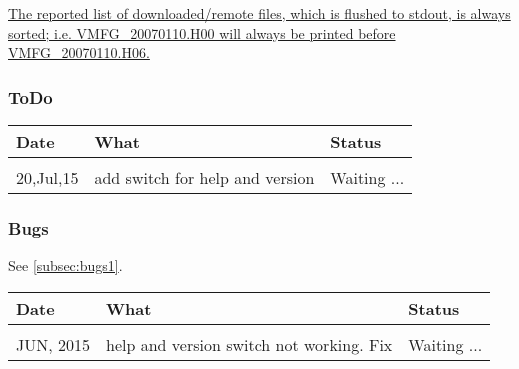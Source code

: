 \underline{The reported list of downloaded/remote files, which is flushed to 
  stdout, is always sorted; i.e. VMFG\_20070110.H00 will always be printed
before VMFG\_20070110.H06.}

\subsubsection{ToDo}
\begin{tabular}{l l l}
Date & What & Status\\
\hline \\
20,Jul,15  & add switch for help and version & Waiting ...\\
\end{tabular}

\subsubsection{Bugs}
See \autoref{subsec:bugs1}.
\bigskip

\begin{tabular}{l l l}
Date & What & Status\\
\hline \\
JUN, 2015 & help and version switch not working. Fix & Waiting ...\\
\end{tabular}
